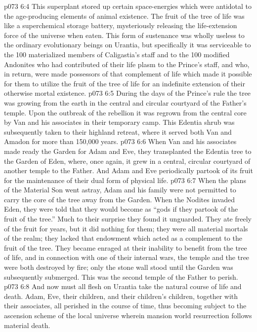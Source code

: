 \vs p073 6:4 This superplant stored up certain space\hyp{}energies which were antidotal to the age\hyp{}producing elements of animal existence. The fruit of the tree of life was like a superchemical storage battery, mysteriously releasing the life\hyp{}extension force of the universe when eaten. This form of sustenance was wholly useless to the ordinary evolutionary beings on Urantia, but specifically it was serviceable to the 100 materialized members of Caligastia’s staff and to the 100 modified Andonites who had contributed of their life plasm to the Prince’s staff, and who, in return, were made possessors of that complement of life which made it possible for them to utilize the fruit of the tree of life for an indefinite extension of their otherwise mortal existence.
\vs p073 6:5 \pc During the days of the Prince’s rule the tree was growing from the earth in the central and circular courtyard of the Father’s temple. Upon the outbreak of the rebellion it was regrown from the central core by Van and his associates in their temporary camp. This Edentia shrub was subsequently taken to their highland retreat, where it served both Van and Amadon for more than 150,000 years.
\vs p073 6:6 When Van and his associates made ready the Garden for Adam and Eve, they transplanted the Edentia tree to the Garden of Eden, where, once again, it grew in a central, circular courtyard of another temple to the Father. And Adam and Eve periodically partook of its fruit for the maintenance of their dual form of physical life.
\vs p073 6:7 \pc When the plans of the Material Son went astray, Adam and his family were not permitted to carry the core of the tree away from the Garden. When the Nodites invaded Eden, they were told that they would become as “gods if they partook of the fruit of the tree.” Much to their surprise they found it unguarded. They ate freely of the fruit for years, but it did nothing for them; they were all material mortals of the realm; they lacked that endowment which acted as a complement to the fruit of the tree. They became enraged at their inability to benefit from the tree of life, and in connection with one of their internal wars, the temple and the tree were both destroyed by fire; only the stone wall stood until the Garden was subsequently submerged. This was the second temple of the Father to perish.
\vs p073 6:8 And now must all flesh on Urantia take the natural course of life and death. Adam, Eve, their children, and their children’s children, together with their associates, all perished in the course of time, thus becoming subject to the ascension scheme of the local universe wherein mansion world resurrection follows material death.
